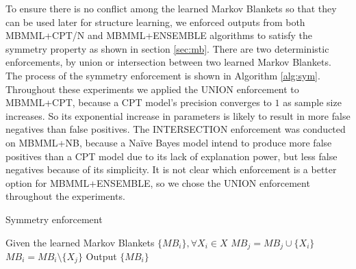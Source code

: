 \documentclass{svmult}
\begin{document}
To ensure there is no conflict among the learned Markov Blankets so that they can be used later for structure learning, we enforced outputs from both MBMML+CPT/N and MBMML+ENSEMBLE algorithms to satisfy the symmetry property as shown in section \ref{sec:mb}. There are two deterministic enforcements, by union or intersection between two learned Markov Blankets. The process of the symmetry enforcement is shown in Algorithm \ref{alg:sym}. Throughout these experiments we applied the UNION enforcement to MBMML+CPT, because a CPT model's precision converges to $1$ as sample size increases. So its exponential increase in parameters is likely to result in more false negatives than false positives. The INTERSECTION enforcement was conducted on MBMML+NB, because a Na\"ive Bayes model intend to produce more false positives than a CPT model due to its lack of explanation power, but less false negatives because of its simplicity. It is not clear which enforcement is a better option for MBMML+ENSEMBLE, so we chose the UNION enforcement throughout the experiments. 

\begin{algorithm}[]
\caption{Symmetry enforcement}
\label{alg:sym}
\begin{algorithmic}[]
\Procedure{}{} Given the learned Markov Blankets $\{MB_i\}, \forall X_i \in X$
				\State $MB_j = MB_j \cup \{X_i\}$
				\State $MB_i = MB_i \setminus \{X_j\}$
			\EndIf
		\EndIf
	\EndFor
\EndFor
	\State Output $\{MB_i\}$
\EndProcedure
\end{algorithmic}
\end{algorithm}
\end{document}

